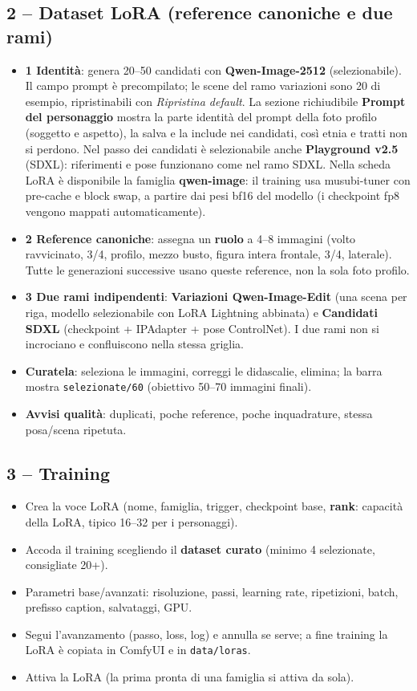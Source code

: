 \documentclass[11pt,a4paper]{article}
\begin{document}
\subsection{2 -- Dataset LoRA (reference canoniche e due rami)}
\begin{itemize}
  \item \textbf{1 \textperiodcentered{} Identit\`a}: genera 20--50 candidati con \textbf{Qwen-Image-2512} (selezionabile). Il campo prompt \`e precompilato; le scene del ramo variazioni sono 20 di esempio, ripristinabili con \emph{Ripristina default}. La sezione richiudibile \textbf{Prompt del personaggio} mostra la parte identit\`a del prompt della foto profilo (soggetto e aspetto), la salva e la include nei candidati, cos\`i etnia e tratti non si perdono. Nel passo dei candidati \`e selezionabile anche \textbf{Playground v2.5} (SDXL): riferimenti e pose funzionano come nel ramo SDXL. Nella scheda LoRA \`e disponibile la famiglia \textbf{qwen-image}: il training usa musubi-tuner con pre-cache e block swap, a partire dai pesi bf16 del modello (i checkpoint fp8 vengono mappati automaticamente).
  \item \textbf{2 \textperiodcentered{} Reference canoniche}: assegna un \textbf{ruolo} a 4--8 immagini (volto ravvicinato, 3/4, profilo, mezzo busto, figura intera frontale, 3/4, laterale). Tutte le generazioni successive usano queste reference, non la sola foto profilo.
  \item \textbf{3 \textperiodcentered{} Due rami indipendenti}: \textbf{Variazioni Qwen-Image-Edit} (una scena per riga, modello selezionabile con LoRA Lightning abbinata) e \textbf{Candidati SDXL} (checkpoint + IPAdapter + pose ControlNet). I due rami non si incrociano e confluiscono nella stessa griglia.
  \item \textbf{Curatela}: seleziona le immagini, correggi le didascalie, elimina; la barra mostra \texttt{selezionate/60} (obiettivo 50--70 immagini finali).
  \item \textbf{Avvisi qualit\`a}: duplicati, poche reference, poche inquadrature, stessa posa/scena ripetuta.
\end{itemize}
\subsection{3 -- Training}
\begin{itemize}
  \item Crea la voce LoRA (nome, famiglia, trigger, checkpoint base, \textbf{rank}: capacit\`a della LoRA, tipico 16--32 per i personaggi).
  \item Accoda il training scegliendo il \textbf{dataset curato} (minimo 4 selezionate, consigliate 20+).
  \item Parametri base/avanzati: risoluzione, passi, learning rate, ripetizioni, batch, prefisso caption, salvataggi, GPU.
  \item Segui l'avanzamento (passo, loss, log) e annulla se serve; a fine training la LoRA \`e copiata in ComfyUI e in \texttt{data/loras}.
  \item Attiva la LoRA (la prima pronta di una famiglia si attiva da sola).
\end{itemize}
\end{document}
